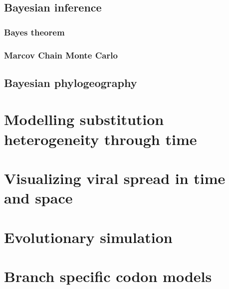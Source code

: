 \documentclass[12pt,twoside]{mitthesis}
\theoremstyle{plain}
\theoremstyle{definition}
\theoremstyle{remark}
\begin{document}
\section{Bayesian inference}

\subsection{Bayes theorem}

\subsection{Marcov Chain Monte Carlo}

\section{Bayesian phylogeography}

\chapter{Modelling substitution heterogeneity through time}


\chapter{Visualizing viral spread in time and space}


\chapter{Evolutionary simulation}


\chapter{Branch specific codon models}



\end{document}
